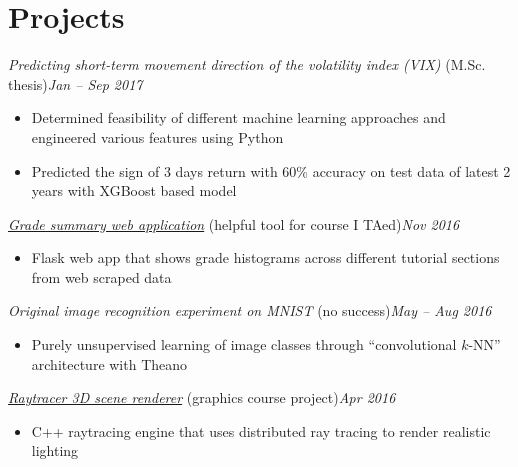 \documentclass[10pt,letterpaper]{article}
\newcommand*\position[1]{\textit{#1}}
\newcommand*\timespan\position
\begin{document}
\section*{Projects}
\position{Predicting short-term movement direction of the volatility index (VIX)} (M.Sc. thesis)\hfill\timespan{Jan -- Sep 2017}
\begin{itemize}
\item Determined feasibility of different machine learning approaches and engineered various features using Python
\item Predicted the sign of 3 days return with 60\% accuracy on test data of latest 2 years with XGBoost based model
\end{itemize}
\position{\href{https://github.com/yumichael/blackboardlearn-statsview}{Grade summary web application}} (helpful tool for course I TAed)\hfill\timespan{Nov 2016}
\begin{itemize}
\item Flask web app that shows grade histograms across different tutorial sections from web scraped data
\end{itemize}
\position{Original image recognition experiment on MNIST} (no success)\hfill\timespan{May -- Aug 2016}
\begin{itemize}
\item Purely unsupervised learning of image classes through ``convolutional \(k\)-NN'' architecture with Theano
\end{itemize}
\position{\href{https://github.com/yumichael/raytrace}{Raytracer 3D scene renderer}} (graphics course project)\hfill\timespan{Apr 2016}
\begin{itemize}
\item C++ raytracing engine that uses distributed ray tracing to render realistic lighting
\end{itemize}
\end{document}
